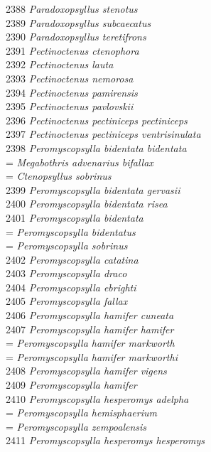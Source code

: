 \documentclass[
]{article}
\begin{document}
2388 \emph{Paradoxopsyllus stenotus}\\
2389 \emph{Paradoxopsyllus subcaecatus}\\
2390 \emph{Paradoxopsyllus teretifrons}\\
2391 \emph{Pectinoctenus ctenophora}\\
2392 \emph{Pectinoctenus lauta}\\
2393 \emph{Pectinoctenus nemorosa}\\
2394 \emph{Pectinoctenus pamirensis}\\
2395 \emph{Pectinoctenus pavlovskii}\\
2396 \emph{Pectinoctenus pectiniceps pectiniceps}\\
2397 \emph{Pectinoctenus pectiniceps ventrisinulata}\\
2398 \emph{Peromyscopsylla bidentata bidentata}\\
= \emph{Megabothris advenarius bifallax}\\
= \emph{Ctenopsyllus sobrinus}\\
2399 \emph{Peromyscopsylla bidentata gervasii}\\
2400 \emph{Peromyscopsylla bidentata risea}\\
2401 \emph{Peromyscopsylla bidentata}\\
= \emph{Peromyscopsylla bidentatus}\\
= \emph{Peromyscopsylla sobrinus}\\
2402 \emph{Peromyscopsylla catatina}\\
2403 \emph{Peromyscopsylla draco}\\
2404 \emph{Peromyscopsylla ebrighti}\\
2405 \emph{Peromyscopsylla fallax}\\
2406 \emph{Peromyscopsylla hamifer cuneata}\\
2407 \emph{Peromyscopsylla hamifer hamifer}\\
= \emph{Peromyscopsylla hamifer markworth}\\
= \emph{Peromyscopsylla hamifer markworthi}\\
2408 \emph{Peromyscopsylla hamifer vigens}\\
2409 \emph{Peromyscopsylla hamifer}\\
2410 \emph{Peromyscopsylla hesperomys adelpha}\\
= \emph{Peromyscopsylla hemisphaerium}\\
= \emph{Peromyscopsylla zempoalensis}\\
2411 \emph{Peromyscopsylla hesperomys hesperomys}\\
\end{document}
